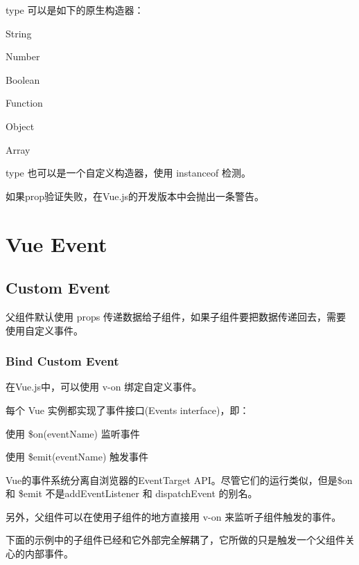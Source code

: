 type 可以是如下的原生构造器：

\begin{compactitem}
\item String
\item Number
\item Boolean
\item Function
\item Object
\item Array
\end{compactitem}

type 也可以是一个自定义构造器，使用 instanceof 检测。

如果prop验证失败，在Vue.js的开发版本中会抛出一条警告。

\chapter{Vue Event}

\section{Custom Event}


父组件默认使用 props 传递数据给子组件，如果子组件要把数据传递回去，需要使用自定义事件。




\subsection{Bind Custom Event}

在Vue.js中，可以使用 v-on 绑定自定义事件。

每个 Vue 实例都实现了事件接口(Events interface)，即：

\begin{compactitem}
\item 使用 \$on(eventName) 监听事件
\item 使用 \$emit(eventName) 触发事件
\end{compactitem}

Vue的事件系统分离自浏览器的EventTarget API。尽管它们的运行类似，但是\$on 和 \$emit 不是addEventListener 和 dispatchEvent 的别名。

另外，父组件可以在使用子组件的地方直接用 v-on 来监听子组件触发的事件。




下面的示例中的子组件已经和它外部完全解耦了，它所做的只是触发一个父组件关心的内部事件。





